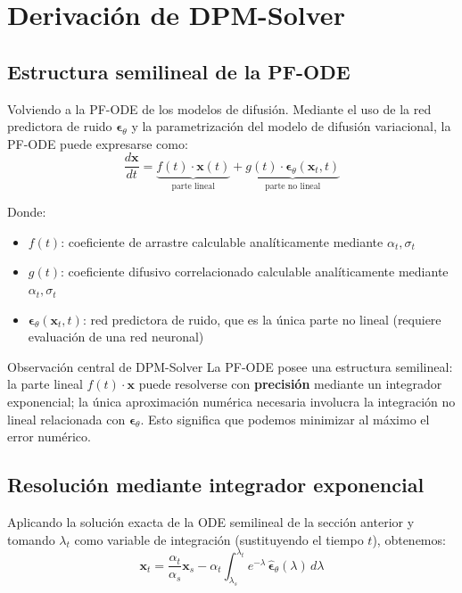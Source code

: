 \section{Derivación de DPM-Solver}

\subsection{Estructura semilineal de la PF-ODE}

Volviendo a la PF-ODE de los modelos de difusión. Mediante el uso de la red predictora de ruido $\boldsymbol{\epsilon}_\theta$ y la parametrización del modelo de difusión variacional, la PF-ODE puede expresarse como:
$$\frac{d\mathbf{x}}{dt} = \underbrace{f(t) \cdot \mathbf{x}(t)}_{\text{parte lineal}} + \underbrace{g(t) \cdot \boldsymbol{\epsilon}_\theta(\mathbf{x}_t, t)}_{\text{parte no lineal}}$$

Donde:
\begin{itemize}
    \item $f(t)$: coeficiente de arrastre calculable analíticamente mediante $\alpha_t, \sigma_t$
    \item $g(t)$: coeficiente difusivo correlacionado calculable analíticamente mediante $\alpha_t, \sigma_t$
    \item $\boldsymbol{\epsilon}_\theta(\mathbf{x}_t, t)$: red predictora de ruido, que es la única parte no lineal (requiere evaluación de una red neuronal)
\end{itemize}

\begin{importantbox}{Observación central de DPM-Solver}
La PF-ODE posee una estructura semilineal: la parte lineal $f(t) \cdot \mathbf{x}$ puede resolverse con \textbf{precisión} mediante un integrador exponencial; la única aproximación numérica necesaria involucra la integración no lineal relacionada con $\boldsymbol{\epsilon}_\theta$. Esto significa que podemos minimizar al máximo el error numérico.
\end{importantbox}

\subsection{Resolución mediante integrador exponencial}

Aplicando la solución exacta de la ODE semilineal de la sección anterior y tomando $\lambda_t$ como variable de integración (sustituyendo el tiempo $t$), obtenemos:
$$\mathbf{x}_t = \frac{\alpha_t}{\alpha_s} \mathbf{x}_s - \alpha_t \int_{\lambda_s}^{\lambda_t} e^{-\lambda}\, \hat{\boldsymbol{\epsilon}}_\theta(\lambda)\, d\lambda$$

